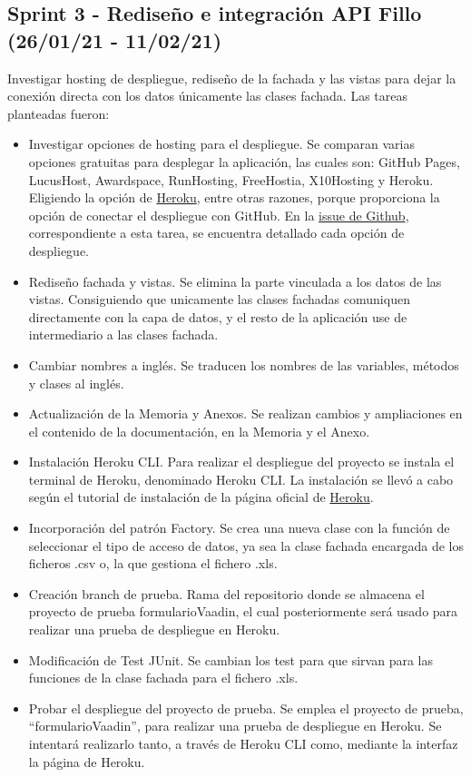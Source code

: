 \subsection{Sprint 3 - Rediseño e integración API Fillo (26/01/21 - 11/02/21)}
Investigar hosting de despliegue, rediseño de la fachada y las vistas para dejar la conexión directa con los datos únicamente las clases fachada.
Las tareas planteadas fueron:
\begin{itemize}
	\item Investigar opciones de hosting para el despliegue. 
		Se comparan varias opciones gratuitas para desplegar la aplicación, las cuales son: GitHub Pages, LucusHost, Awardspace, RunHosting, FreeHostia, X10Hosting y Heroku. Eligiendo la opción de \href{https://dashboard.heroku.com/}{Heroku}, entre otras razones, porque proporciona la opción de conectar el despliegue con GitHub. En la \href{https://github.com/dbo1001/Gestor-TFG-2021/issues/26}{issue de Github}, correspondiente a esta tarea, se encuentra detallado cada opción de despliegue.
	\item Rediseño fachada y vistas. 
		Se elimina la parte vinculada a los datos de las vistas. Consiguiendo que unicamente las clases fachadas comuniquen directamente con la capa de datos, y el resto de la aplicación use de intermediario a las clases fachada.
	\item Cambiar nombres a inglés.
		Se traducen los nombres de las variables, métodos y clases al inglés.
	\item Actualización de la Memoria y Anexos.
		Se realizan cambios y ampliaciones en el contenido de la documentación, en la Memoria y el Anexo.
	\item Instalación Heroku CLI. 
		Para realizar el despliegue del proyecto se instala el terminal de Heroku, denominado Heroku CLI. La instalación se llevó a cabo según el tutorial de instalación de la página oficial de \href{https://devcenter.heroku.com/articles/heroku-cli}{Heroku}.
	\item Incorporación del patrón Factory. 
		Se crea una nueva clase con la función de seleccionar el tipo de acceso de datos, ya sea la clase fachada encargada de los ficheros .csv o, la que gestiona el fichero .xls.
	\item Creación branch de prueba. 
		Rama del repositorio donde se almacena el proyecto de prueba formularioVaadin, el cual posteriormente será usado para realizar una prueba de despliegue en Heroku.
	\item Modificación de Test JUnit. 
		Se cambian los test para que sirvan para las funciones de la clase fachada para el fichero .xls. 
	\item Probar el despliegue del proyecto de prueba. 
		Se emplea el proyecto de prueba, ``formularioVaadin'', para realizar una prueba de despliegue en Heroku. Se intentará realizarlo tanto, a través de Heroku CLI como, mediante la interfaz la página de Heroku.
	
\end{itemize}

